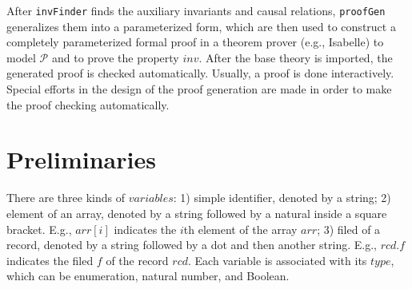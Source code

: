 \documentclass{llncs}
\begin{document}
After {\tt invFinder} finds the auxiliary invariants and causal relations, {\tt proofGen} generalizes them  into a parameterized form, which are then used to construct a completely parameterized formal proof in a theorem prover (e.g., Isabelle) to model $\mathcal{P}$ and to prove the property $inv$. After the base theory is imported, the generated proof is checked automatically.  Usually, a proof is done interactively. Special efforts in the design of the proof generation are made in order to make the proof checking automatically. %

\vspace{-0.5cm}
\section{Preliminaries}\label{sec:Preliminaries}
\vspace{-0.3cm}
There are three kinds of $variables$:
1) simple identifier, denoted by a string;
2) element of an array, denoted by a string followed by a natural inside a square bracket. E.g., $arr[i]$ indicates the $i$th element of the array $arr$;
3) filed of a record, denoted by a string followed by a dot and then another string. E.g., $rcd.f$ indicates the filed $f$ of the record $rcd$.
Each variable is associated with its $type$, which can be enumeration, natural number, and Boolean.

\end{document}
